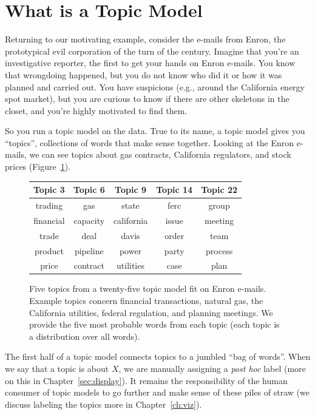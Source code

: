 \section{What is a Topic Model}

Returning to our motivating example, consider the e-mails from Enron, the prototypical
evil corporation of the turn of the century.  Imagine that you're an
investigative reporter, the first to get your hands on Enron e-mails.  You know
that wrongdoing happened, but you do not know who did it or how it was planned
and carried out.  You have suspicions (e.g., around the California energy spot market),
but you are curious to know if there are other skeletons in the closet, and
you're highly motivated to find them.

So you run a topic model on the data.  True to its name, a topic model
gives you ``topics'', collections of words that make sense together.
Looking at the Enron e-mails, we can see topics about gas contracts,
California regulators, and stock prices
(Figure~\ref{fig:enron_topics}).

\begin{figure}
\begin{center}
  \begin{tabular}{ccccc}
    Topic 3    & Topic 6   & Topic 9    & Topic 14 & Topic 22 \\
    \hline
    trading    & gas       & state      & ferc     & group \\
    financial  & capacity  & california & issue    & meeting \\
    trade      & deal      & davis      & order    & team \\
    product    & pipeline  & power      & party    & process \\
    price      & contract  & utilities  & case     & plan \\
    \hline
  \end{tabular}
\end{center}

  \caption{Five topics from a twenty-five topic model fit on Enron
    e-mails.  Example topics concern financial transactions, natural
    gas, the California utilities, federal regulation, and planning
    meetings.  We provide the five most probable words from each topic
  (each topic is a distribution over all words).}
  \label{fig:enron_topics}
\end{figure}

The first half of a topic model connects topics to a jumbled ``bag of words''.
When we say that a topic is about $X$, we are manually assigning a \textit{post hoc} label
 (more on this in Chapter~\ref{sec:display}).
It remains the responsibility of the human consumer of topic models to go further and
make sense of these piles of straw (we discuss labeling the topics
more in Chapter~\ref{ch:viz}).

